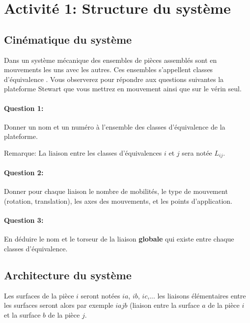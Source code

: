 

\section{Activité 1: Structure du système}

\subsection{Cinématique du système}

Dans un système mécanique des ensembles de pièces assemblés sont en mouvements les uns avec les autres. Ces ensembles s'appellent \og classes d'équivalence \fg. Vous observerez pour répondre aux questions suivantes la plateforme Stewart que vous mettrez en mouvement ainsi que sur le vérin seul.

\paragraph{Question 1:} Donner un nom et un  numéro à l'ensemble des classes d'équivalence de la plateforme.

\reponse[3]

Remarque: La liaison entre les classes d'équivalences $i$ et $j$ sera notée $L_{ij}$.

\paragraph{Question 2:} Donner pour chaque liaison le nombre de mobilités, le type de mouvement (rotation, translation), les axes des mouvements, et les points d'application.

\reponse[3]

\paragraph{Question 3:} En déduire le nom et le torseur de la liaison \textbf{globale} qui existe entre chaque classes d'équivalence.

\reponse[3]

\subsection{Architecture du système}

Les surfaces de la pièce $i$ seront notées $ia$, $ib$, $ic$,... les liaisons élémentaires entre les surfaces seront alors par exemple $iajb$ (liaison entre la surface $a$ de la pièce $i$ et la surface $b$ de la pièce $j$.

